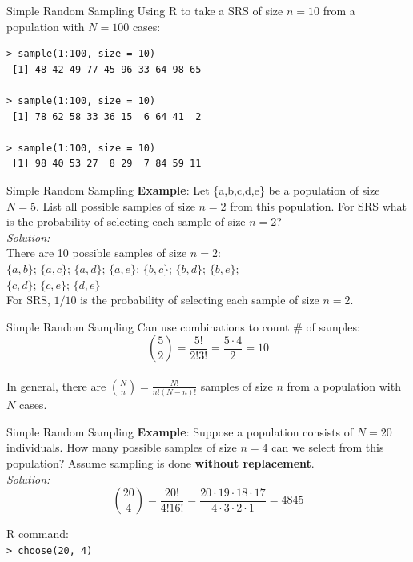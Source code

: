 \documentclass{beamer}
\begin{document}
\begin{frame}[fragile]{Simple Random Sampling}
Using R to take a SRS of size $n=10$ from a population with $N=100$ cases:
\begin{verbatim}
> sample(1:100, size = 10)
 [1] 48 42 49 77 45 96 33 64 98 65
 
> sample(1:100, size = 10)
 [1] 78 62 58 33 36 15  6 64 41  2
 
> sample(1:100, size = 10)
 [1] 98 40 53 27  8 29  7 84 59 11
\end{verbatim}
\end{frame}

\begin{frame}{Simple Random Sampling}
\textbf{Example}:  Let \{a,b,c,d,e\} be a population of size $N=5$.  List all possible samples of size $n=2$ from this population.  For SRS what is the probability of selecting each sample of size $n=2$?\\
\vspace{10pt}
\color{blue}
\emph{Solution:}\\
There are 10 possible samples of size $n=2$:\\
$\{a, b\}$; $\{a, c\}$; $\{a, d\}$; $\{a, e\}$; $\{b, c\}$; $\{b, d\}$; $\{b, e\}$;\\ $\{c, d\}$; $\{c, e\}$; $\{d, e\}$\\
\vspace{10pt}
For SRS, $1/10$ is the probability of selecting each sample of size $n=2$.
\end{frame}

\begin{frame}{Simple Random Sampling}
\color{blue}
Can use combinations to count \# of samples:\\
\vspace{30pt}
$$\binom{5}{2} = \frac{5!}{2!3!} = \frac{5 \cdot 4}{2} = 10$$\\
\vspace{30pt}
In general, there are $\binom{N}{n} = \frac{N!}{n!(N-n)!}$ samples of size $n$ from a population with $N$ cases.
\end{frame}

\begin{frame}{Simple Random Sampling}
\textbf{Example}:  Suppose a population consists of $N=20$ individuals.  How many possible samples of size $n=4$ can we select from this population?  Assume sampling is done \textbf{without replacement}.\\
\vspace{10pt}
\color{blue}
\emph{Solution:}\\
$$\binom{20}{4} = \frac{20!}{4!16!} = \frac{20 \cdot 19 \cdot 18 \cdot 17}{4 \cdot 3 \cdot 2 \cdot 1} = \boxed{4845}$$
\vspace{10pt}

R command:\\
\texttt{> choose(20, 4)}
\end{frame}
\end{document}
